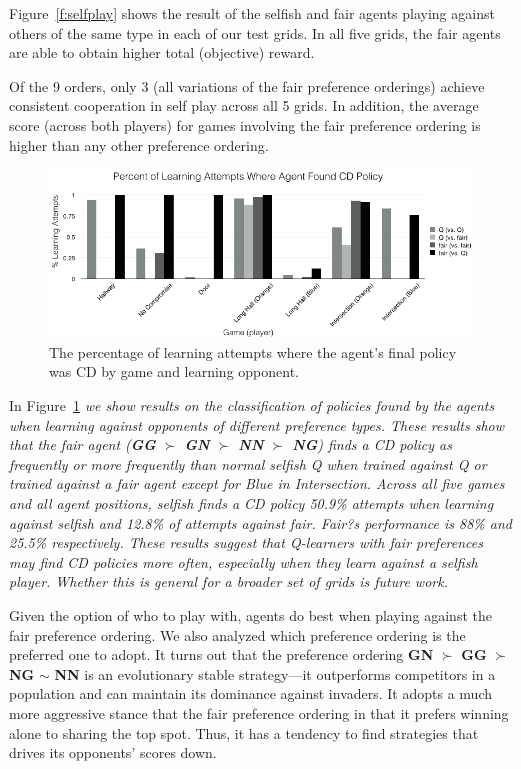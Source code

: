 \documentclass[letterpaper]{article}
\begin{document}
Figure~\ref{f:selfplay} shows the result of the selfish and fair
agents playing against others of the same type in each of our test
grids. In all five grids, the fair agents are able to obtain higher
total (objective) reward.

Of the 9 orders, only 3 (all variations of the fair preference
orderings) achieve consistent cooperation in self play across all 5
grids. In addition, the average score (across both players) for games
involving the fair preference ordering is higher than any other
preference ordering. %

\begin{figure}
\centering
\includegraphics[width=0.8\columnwidth]{figures/ConvCD.png}
\caption{The percentage of learning attempts where the agent's final policy was CD by game and learning opponent.}
\label{f:convCD}
\end{figure}

In Figure~\ref{f:convCD} \emph{we show results on the classification of policies found by the agents when learning against opponents of different preference types. These results show that the fair agent ({\bf GG} $\succ$ {\bf GN} $\succ$
{\bf NN} $\succ$ {\bf NG}) finds a CD policy as frequently or more frequently than normal selfish Q when trained against Q or trained against a fair agent except for Blue in Intersection. Across all five games and all agent positions, selfish finds a CD policy 50.9\% attempts when learning against selfish and 12.8\% of attempts against fair. Fair?s performance is 88\% and 25.5\% respectively. These results suggest that Q-learners with fair preferences may find CD policies more often, especially when they learn against a selfish player. Whether this is general for a broader set of grids is future work.}

Given the option of who to play with, agents do best when playing
against the fair preference ordering. We also analyzed which
preference ordering is the preferred one to adopt. It turns out that
the preference ordering {\bf GN} $\succ$ {\bf GG} $\succ$ {\bf NG}
$\sim$ {\bf NN} is an evolutionary stable strategy---it outperforms
competitors in a population and can maintain its dominance against
invaders. It adopts a much more aggressive stance that the fair
preference ordering in that it prefers winning alone to sharing the
top spot. Thus, it has a tendency to find strategies that drives its
opponents' scores down.
\end{document}
